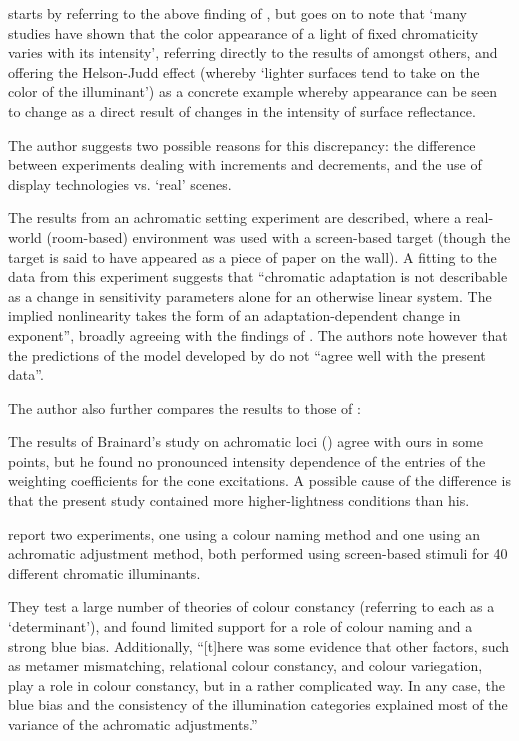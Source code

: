 \textbf{\citet{kuriki_loci_2006}} starts by referring to the above finding of \citet{brainard_color_1998}, but goes on to note that `many studies have shown that the color appearance of a light of fixed chromaticity varies with its intensity', referring directly to the results of \citet{werner_effect_1982} amongst others, and offering the Helson-Judd effect (whereby `lighter surfaces tend to take on the color of the illuminant') as a concrete example whereby appearance can be seen to change as a direct result of changes in the intensity of surface reflectance.

The author suggests two possible reasons for this discrepancy: the difference between experiments dealing with increments and decrements, and the use of display technologies vs. `real' scenes.

The results from an achromatic setting experiment are described, where a real-world (room-based) environment was used with a screen-based target (though the target is said to have appeared as a piece of paper on the wall). A fitting to the data from this experiment suggests that ``chromatic adaptation is not describable as a change in sensitivity parameters alone for an otherwise linear system. The implied nonlinearity takes the form of an adaptation-dependent change in exponent'', broadly agreeing with the findings of \citet{walraven_chromatic_1982}. The authors note however that the predictions of the model developed by \citet{walraven_chromatic_1982} do not ``agree well with the present data''.

The author also further compares the results to those of \citet{brainard_color_1998}:

\begin{itquote}{}
The results of Brainard’s study on achromatic loci (\citet{brainard_color_1998}) agree with ours in some points, but he found
no pronounced intensity dependence of the entries of the
weighting coefficients for the cone excitations. A possible
cause of the difference is that the present study contained
more higher-lightness conditions than his.
\end{itquote}

\textbf{\citet{weiss_determinants_2017}} report two experiments, one using a colour naming method and one using an achromatic adjustment method, both performed using screen-based stimuli for 40 different chromatic illuminants.

They test a large number of theories of colour constancy (referring to each as a `determinant'), and found limited support for a role of colour naming and a strong blue bias. Additionally, ``[t]here was some evidence that other factors, such as metamer mismatching, relational colour constancy, and colour variegation, play a role in colour constancy, but in a rather complicated way. In any case, the blue bias and the consistency of the illumination categories explained most of the variance of the achromatic adjustments.''





